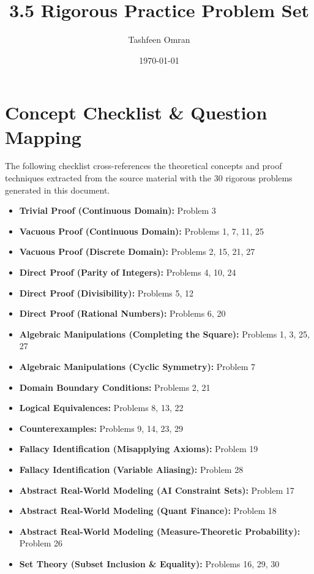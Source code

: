 \documentclass[12pt]{article}
\title{3.5 Rigorous Practice Problem Set}
\author{Tashfeen Omran}
\date{\today}
\begin{document}
\maketitle

\tableofcontents
\newpage

\section{Concept Checklist \& Question Mapping}
\label{sec:checklist_start}
The following checklist cross-references the theoretical concepts and proof techniques extracted from the source material with the 30 rigorous problems generated in this document.

\begin{itemize}
    \item \textbf{Trivial Proof (Continuous Domain):} Problem 3
    \item \textbf{Vacuous Proof (Continuous Domain):} Problems 1, 7, 11, 25
    \item \textbf{Vacuous Proof (Discrete Domain):} Problems 2, 15, 21, 27
    \item \textbf{Direct Proof (Parity of Integers):} Problems 4, 10, 24
    \item \textbf{Direct Proof (Divisibility):} Problems 5, 12
    \item \textbf{Direct Proof (Rational Numbers):} Problems 6, 20
    \item \textbf{Algebraic Manipulations (Completing the Square):} Problems 1, 3, 25, 27
    \item \textbf{Algebraic Manipulations (Cyclic Symmetry):} Problem 7
    \item \textbf{Domain Boundary Conditions:} Problems 2, 21
    \item \textbf{Logical Equivalences:} Problems 8, 13, 22
    \item \textbf{Counterexamples:} Problems 9, 14, 23, 29
    \item \textbf{Fallacy Identification (Misapplying Axioms):} Problem 19
    \item \textbf{Fallacy Identification (Variable Aliasing):} Problem 28
    \item \textbf{Abstract Real-World Modeling (AI Constraint Sets):} Problem 17
    \item \textbf{Abstract Real-World Modeling (Quant Finance):} Problem 18
    \item \textbf{Abstract Real-World Modeling (Measure-Theoretic Probability):} Problem 26
    \item \textbf{Set Theory (Subset Inclusion \& Equality):} Problems 16, 29, 30
\end{itemize}
\end{document}
